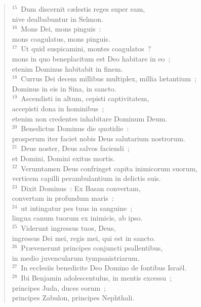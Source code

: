\begin{verse}
${}^{15}$~Dum discernit c\ae lestis reges super eam,\\ nive dealbabuntur in Selmon.\\
${}^{16}$~Mons Dei, mons pinguis~:\\ mons coagulatus, mons pinguis.\\
${}^{17}$~Ut quid suspicamini, montes coagulatos~?\\ mons in quo beneplacitum est Deo habitare in eo~;\\ etenim Dominus habitabit in finem.\\
${}^{18}$~Currus Dei decem millibus multiplex, millia l\ae tantium~;\\ Dominus in eis in Sina, in sancto.\\
${}^{19}$~Ascendisti in altum, cepisti captivitatem,\\ accepisti dona in hominibus~;\\ etenim non credentes inhabitare Dominum Deum.\\
${}^{20}$~Benedictus Dominus die quotidie~:\\ prosperum iter faciet nobis Deus salutarium nostrorum.\\
${}^{21}$~Deus noster, Deus salvos faciendi~;\\ et Domini, Domini exitus mortis.\\
${}^{22}$~Verumtamen Deus confringet capita inimicorum suorum,\\ verticem capilli perambulantium in delictis suis.\\
${}^{23}$~Dixit Dominus~: Ex Basan convertam,\\ convertam in profundum maris~:\\
${}^{24}$~ut intingatur pes tuus in sanguine~;\\ lingua canum tuorum ex inimicis, ab ipso.\\
${}^{25}$~Viderunt ingressus tuos, Deus,\\ ingressus Dei mei, regis mei, qui est in sancto.\\
${}^{26}$~Pr\ae venerunt principes conjuncti psallentibus,\\ in medio juvencularum tympanistriarum.\\
${}^{27}$~In ecclesiis benedicite Deo Domino de fontibus Isra\"el.\\
${}^{28}$~Ibi Benjamin adolescentulus, in mentis excessu~;\\ principes Juda, duces eorum~;\\ principes Zabulon, principes Nephthali.\\

\end{verse}
